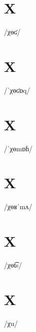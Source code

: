 \documentclass[10pt,a4paper,twoside]{book}
\begin{document}
\section*{X}

\begin{multicols}{3}
 {/χɵʛ/} {}
\end{multicols}

\section*{X}

\begin{multicols}{3}
 {/ˈχɵʛɒq/} {}
\end{multicols}

\section*{X}

\begin{multicols}{3}
 {/ˈχɵmɒɦ/} {}
\end{multicols}

\section*{X}

\begin{multicols}{3}
 {/χɵʁˈmʌ/} {}
\end{multicols}

\section*{X}

\begin{multicols}{3}
 {/χɵt͡s/} {}
\end{multicols}

\section*{X}

\begin{multicols}{3}
 {/χu/} {}
\end{multicols}
\end{document}
